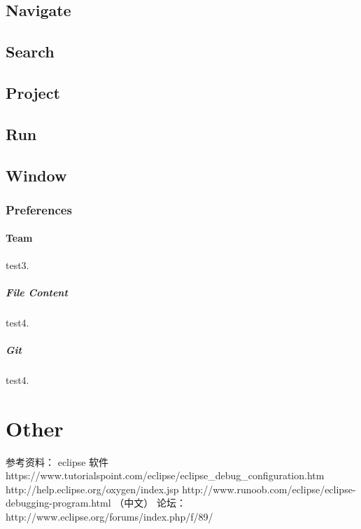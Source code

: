 \documentclass[UTF8]{article}
\begin{document}
        \subsection{Navigate}
        \subsection{Search}
        \subsection{Project}
        \subsection{Run}
        \subsection{Window}
          \subsubsection{Preferences}
            \paragraph{Team} test3.
              \subparagraph{File Content} test4.
              \subparagraph{Git} test4.
    \section{Other}
    参考资料：
    eclipse 软件
    https://www.tutorialspoint.com/eclipse/eclipse_debug_configuration.htm
    http://help.eclipse.org/oxygen/index.jsp
    http://www.runoob.com/eclipse/eclipse-debugging-program.html （中文）
    论坛：http://www.eclipse.org/forums/index.php/f/89/
\end{document}
